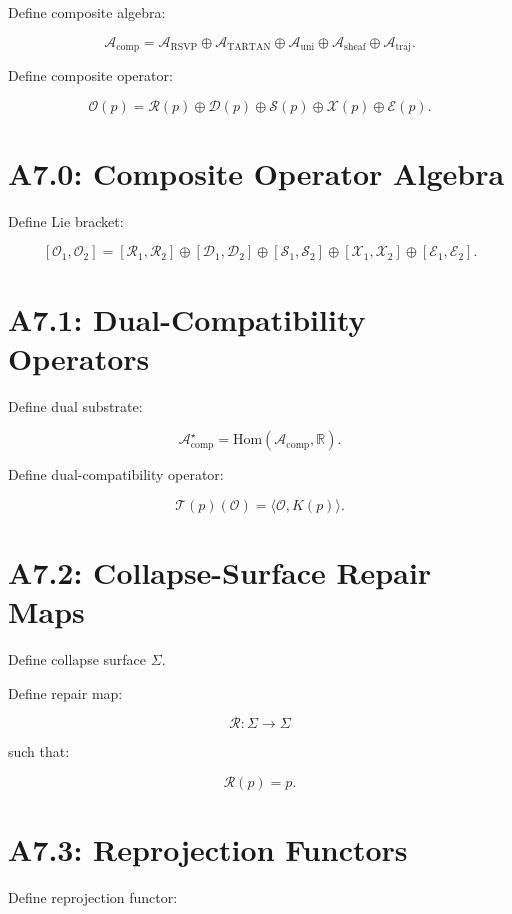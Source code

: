 Define composite algebra:

\[
\mathcal{A}_{\mathrm{comp}} =
\mathcal{A}_{\mathrm{RSVP}} \oplus
\mathcal{A}_{\mathrm{TARTAN}} \oplus
\mathcal{A}_{\mathrm{uni}} \oplus
\mathcal{A}_{\mathrm{sheaf}} \oplus
\mathcal{A}_{\mathrm{traj}}.
\]

Define composite operator:

\[
\mathcal{O}(p) =
\mathcal{R}(p) \oplus
\mathcal{D}(p) \oplus
\mathcal{S}(p) \oplus
\mathcal{X}(p) \oplus
\mathcal{E}(p).
\]

\section{A7.0: Composite Operator Algebra}

Define Lie bracket:

\[
[\mathcal{O}_1,\mathcal{O}_2] =
[\mathcal{R}_1,\mathcal{R}_2] \oplus
[\mathcal{D}_1,\mathcal{D}_2] \oplus
[\mathcal{S}_1,\mathcal{S}_2] \oplus
[\mathcal{X}_1,\mathcal{X}_2] \oplus
[\mathcal{E}_1,\mathcal{E}_2].
\]

\section{A7.1: Dual-Compatibility Operators}

Define dual substrate:

\[
\mathcal{A}^\star_{\mathrm{comp}} = \mathrm{Hom}(\mathcal{A}_{\mathrm{comp}},\mathbb{R}).
\]

Define dual-compatibility operator:

\[
\mathcal{T}(p)(\mathcal{O}) = \langle \mathcal{O}, K(p) \rangle.
\]

\section{A7.2: Collapse-Surface Repair Maps}

Define collapse surface $\Sigma$.

Define repair map:

\[
\mathcal{R} : \Sigma \to \Sigma
\]

such that:

\[
\mathcal{R}(p) = p.
\]

\section{A7.3: Reprojection Functors}

Define reprojection functor:

